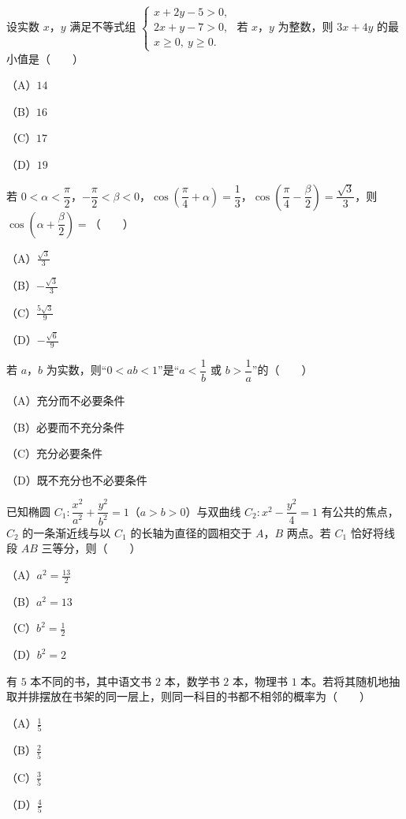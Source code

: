 \begin{question}
设实数 $x$，$y$ 满足不等式组 $\begin{cases}x+2y-5>0,\\2x+y-7>0,\\x\geqslant0,\ y\geqslant0.\end{cases}$ 若 $x$，$y$ 为整数，则 $3x+4y$ 的最小值是\mbox{（　　）}

（A）$14$

（B）$16$

（C）$17$

（D）$19$

\end{question}
\begin{question}
若 $0<\alpha<\dfrac\pi2$，$-\dfrac\pi2<\beta<0$，$\cos\left(\dfrac\pi4+\alpha\right)=\dfrac13$，$\cos\left(\dfrac\pi4-\dfrac\beta2\right)=\dfrac{\sqrt3}3$，则 $\cos\left(\alpha+\dfrac\beta2\right)=$\mbox{（　　）}

（A）$\frac{\sqrt3}3$

（B）$-\frac{\sqrt3}3$

（C）$\frac{5\sqrt3}9$

（D）$-\frac{\sqrt6}9$

\end{question}
\begin{question}
若 $a$，$b$ 为实数，则“$0<ab<1$”是“$a<\dfrac1b$ 或 $b>\dfrac1a$”的\mbox{（　　）}

（A）充分而不必要条件

（B）必要而不充分条件

（C）充分必要条件

（D）既不充分也不必要条件

\end{question}
\begin{question}
已知椭圆 $C_1:\dfrac{x^2}{a^2}+\dfrac{y^2}{b^2}=1$（$a>b>0$）与双曲线 $C_2:x^2-\dfrac{y^2}{4}=1$ 有公共的焦点，$C_2$ 的一条渐近线与以 $C_1$ 的长轴为直径的圆相交于 $A$，$B$ 两点。若 $C_1$ 恰好将线段 $AB$ 三等分，则\mbox{（　　）}

（A）$a^2=\frac{13}2$

（B）$a^2=13$

（C）$b^2=\frac12$

（D）$b^2=2$

\end{question}
\begin{question}
有 $5$ 本不同的书，其中语文书 $2$ 本，数学书 $2$ 本，物理书 $1$ 本。若将其随机地抽取并排摆放在书架的同一层上，则同一科目的书都不相邻的概率为\mbox{（　　）}

（A）$\frac15$

（B）$\frac25$

（C）$\frac35$

（D）$\frac45$

\end{question}
